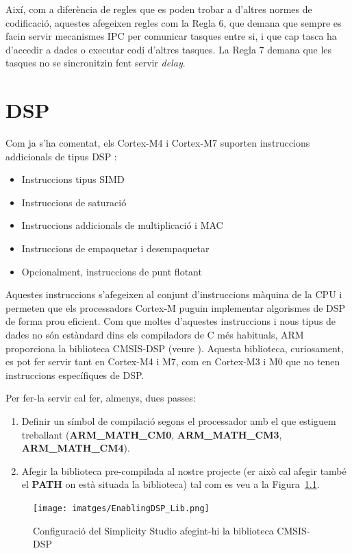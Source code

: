 Així, com a diferència de regles que es poden trobar a d'altres normes de codificació, aquestes afegeixen regles com la Regla 6, que demana que sempre es facin servir mecanismes IPC per comunicar tasques entre si, i que cap tasca ha d'accedir a dades o executar codi d'altres tasques. La Regla 7 demana que les tasques no se sincronitzin fent servir {\em delay}.

\chapter{DSP}
\label{ch:DSP}
Com ja s'ha comentat, els Cortex-M4 i Cortex-M7 suporten instruccions addicionals de tipus \gls{DSP} \cite[173]{GuideCortexM3M4}\cite[255]{DesignersGuide}:
\begin{itemize}
 \item Instruccions tipus \gls{SIMD}
 \item Instruccions de saturació
 \item Instruccions addicionals de multiplicació i \gls{MAC}
 \item Instruccions de empaquetar i desempaquetar
 \item Opcionalment, instruccions de punt flotant
\end{itemize}

Aquestes instruccions s'afegeixen al conjunt d'instruccions màquina de la CPU i permeten que els processadors Cortex-M puguin implementar algorismes de DSP de forma prou eficient. Com que moltes d'aquestes instruccions i nous tipus de dades no són estàndard dins els compiladors de C més habituals, \gls{ARM} proporciona la biblioteca CMSIS-DSP (veure ). Aquesta biblioteca, curiosament, es pot fer servir tant en Cortex-M4 i M7, com en Cortex-M3 i M0 que no tenen instruccions específiques de DSP.

Per fer-la servir cal fer, almenys, dues passes:
\begin{enumerate}
 \item Definir un símbol de compilació segons el processador amb el que estiguem treballant ({\bf ARM\_MATH\_CM0}, {\bf ARM\_MATH\_CM3}, {\bf ARM\_MATH\_CM4}).
 \item Afegir la biblioteca pre-compilada al nostre projecte (er això cal afegir també el {\bf PATH} on està situada la biblioteca) tal com es veu a la Figura~\ref{fig:EnableDSP}.
\end{enumerate}

\begin{figure}
 \centering
 \texttt{[image: imatges/EnablingDSP\_Lib.png]}
 \caption{Configuració del Simplicity Studio afegint-hi la biblioteca CMSIS-DSP}
 \label{fig:EnableDSP}
\end{figure}

